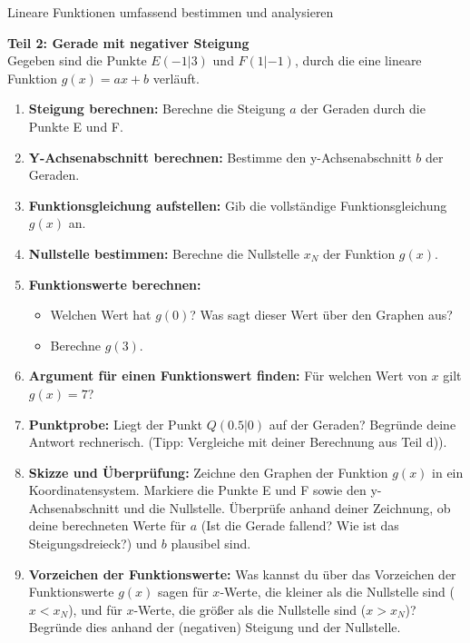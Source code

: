 \begin{aufgabenumgebung}{Lineare Funktionen umfassend bestimmen und analysieren}
\bigskip %

\textbf{Teil 2: Gerade mit negativer Steigung} \\
Gegeben sind die Punkte $E(-1|3)$ und $F(1|-1)$, durch die eine lineare Funktion $g(x) = ax+b$ verläuft.

\begin{enumerate}[label=(\alph*)]
    \item \textbf{Steigung berechnen:} Berechne die Steigung $a$ der Geraden durch die Punkte E und F.
    \item \textbf{Y-Achsenabschnitt berechnen:} Bestimme den y-Achsenabschnitt $b$ der Geraden.
    \item \textbf{Funktionsgleichung aufstellen:} Gib die vollständige Funktionsgleichung $g(x)$ an.
    \item \textbf{Nullstelle bestimmen:} Berechne die Nullstelle $x_N$ der Funktion $g(x)$.
    \item \textbf{Funktionswerte berechnen:}
        \begin{itemize}
            \item Welchen Wert hat $g(0)$? Was sagt dieser Wert über den Graphen aus?
            \item Berechne $g(3)$.
        \end{itemize}
    \item \textbf{Argument für einen Funktionswert finden:} Für welchen Wert von $x$ gilt $g(x) = 7$?
    \item \textbf{Punktprobe:} Liegt der Punkt $Q(0.5|0)$ auf der Geraden? Begründe deine Antwort rechnerisch. (Tipp: Vergleiche mit deiner Berechnung aus Teil d)).
    \item \textbf{Skizze und Überprüfung:} Zeichne den Graphen der Funktion $g(x)$ in ein Koordinatensystem. Markiere die Punkte E und F sowie den y-Achsenabschnitt und die Nullstelle. Überprüfe anhand deiner Zeichnung, ob deine berechneten Werte für $a$ (Ist die Gerade fallend? Wie ist das Steigungsdreieck?) und $b$ plausibel sind.
    \item \textbf{Vorzeichen der Funktionswerte:} Was kannst du über das Vorzeichen der Funktionswerte $g(x)$ sagen für $x$-Werte, die kleiner als die Nullstelle sind ($x < x_N$), und für $x$-Werte, die größer als die Nullstelle sind ($x > x_N$)? Begründe dies anhand der (negativen) Steigung und der Nullstelle.
\end{enumerate}
\end{aufgabenumgebung}

